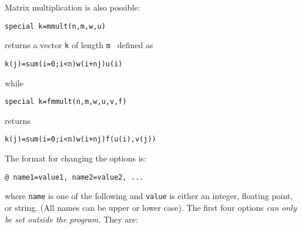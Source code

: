 Matrix multiplication is also possible:
\begin{verbatim}
special k=mmult(n,m,w,u)
\end{verbatim}
returns a vector {\tt k}  of length {\tt m } defined as
\begin{verbatim}
k(j)=sum(i=0;i<n)w(i+nj)u(i)
\end{verbatim}
while
 \begin{verbatim}
special k=fmmult(n,m,w,u,v,f)
\end{verbatim} 
returns
\begin{verbatim}
k(j)=sum(i=0;i<n)w(i+nj)f(u(i),v(j))
\end{verbatim}
\medskip
{}
The format for changing the options is:
\begin{verbatim}
@ name1=value1, name2=value2, ...
\end{verbatim}
where {\tt name} is one of the following and {\tt value} is either an
integer, floating point, or string.  (All names can be upper or lower
case). The first four options {\em can
only be set outside the program.}  They are:
